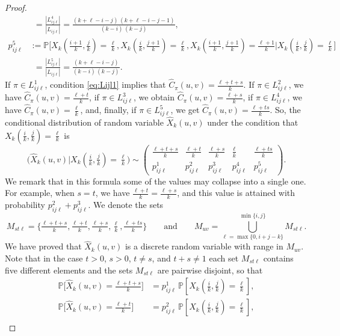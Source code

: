\documentclass[12pt,a4paper]{amsart}
\theoremstyle{definition}
\newcommand{\Chat}{\widehat{C}}
\newcommand{\Xhat}{\widehat{X}}
\newcommand{\PP}{\mathbb{P}}
\begin{document}
\begin{proof}
\begin{align*}
   & \phantom{:}= \frac{|L_{ij\ell}^4|}{|L_{ij\ell}|} = \frac{(k+\ell-i-j) \, (k+\ell-i-j-1)}{(k-i) \, (k-j)} , \\
   p_{ij\ell}^5 &:=\PP\big[X_k(\tfrac{i+1}{k},\tfrac{j}{k}) = \tfrac{\ell}{k},  X_k(\tfrac{i}{k},\tfrac{j+1}{k}) = \tfrac{\ell}{k},  X_k(\tfrac{i+1}{k},\tfrac{j+1}{k}) = \tfrac{\ell+1}{k} \big| X_k(\tfrac{i}{k},\tfrac{j}{k}) = \tfrac{\ell}{k}\big] \\
   & \phantom{:}= \frac{|L_{ij\ell}^5|}{|L_{ij\ell}|} = \frac{(k+\ell-i-j)}{(k-i) \, (k-j)} .
\end{align*}
If $\pi \in L_{ij\ell}^1$, condition \eqref{eq:Lijl1} implies that $\Chat_\pi(u,v) =  \frac{\ell+t+s}{k}$. If $\pi \in L_{ij\ell}^2$, we have $\Chat_\pi(u,v) =  \frac{\ell+t}{k}$, if $\pi \in L_{ij\ell}^3$, we obtain $\Chat_\pi(u,v) =  \frac{\ell+s}{k}$, if $\pi \in L_{ij\ell}^4$, we have $\Chat_\pi(u,v) =  \frac{\ell}{k}$, and, finally, if $\pi \in L_{ij\ell}^5$, we get $\Chat_\pi(u,v) =  \frac{\ell+ts}{k}$.
So, the conditional distribution of random variable $\Xhat_k(u,v)$ under the condition that $X_k(\tfrac{i}{k},\tfrac{j}{k}) = \tfrac{\ell}{k}$ is
$$\big(\Xhat_k(u,v) \big| X_k(\tfrac{i}{k},\tfrac{j}{k}) = \tfrac{\ell}{k}\big) \sim  \begin{pmatrix}
    \frac{\ell+t+s}{k} & \frac{\ell+t}{k} & \frac{\ell+s}{k} & \frac{\ell}{k} & \frac{\ell+ts}{k} \\[2mm]
    p_{ij\ell}^1 & p_{ij\ell}^2 & p_{ij\ell}^3 & p_{ij\ell}^4 & p_{ij\ell}^5
\end{pmatrix}.$$
We remark that in this formula some of the values may collapse into a single one. For example, when $s=t$, we have $\frac{\ell+t}{k}=\frac{\ell+s}{k}$, and this value is attained with probability $p_{ij\ell}^2+p_{ij\ell}^3$.
We denote the sets
$$M_{st\ell} = \{\tfrac{\ell+t+s}{k}, \tfrac{\ell+t}{k}, \tfrac{\ell+s}{k}, \tfrac{\ell}{k}, \tfrac{\ell+ts}{k}\} \qquad \text{and} \qquad M_{uv} = \bigcup_{\ell=\max \{0,  i+j-k \}}^{\min \{i,j \}} M_{st\ell}.$$
We have proved that $\Xhat_k(u,v)$ is a discrete random variable with range in $M_{uv}$. Note that in the case $t > 0$, $s > 0$, $t\ne s$, and $t+s \ne 1$ each set $M_{st\ell}$ contains five different elements and the sets $M_{st\ell}$ are pairwise disjoint, so that 
\begin{align*}
    \PP\big[\Xhat_k(u,v) = \tfrac{\ell+t+s}{k}\big] &= p_{ij\ell}^1\, \PP[X_k(\tfrac{i}{k},\tfrac{j}{k}) = \tfrac{\ell}{k}], \\
    \PP\big[\Xhat_k(u,v) = \tfrac{\ell+t}{k}\big] &= p_{ij\ell}^2\, \PP[X_k(\tfrac{i}{k},\tfrac{j}{k}) = \tfrac{\ell}{k}], \\

\end{align*}
\end{proof}
\end{document}
